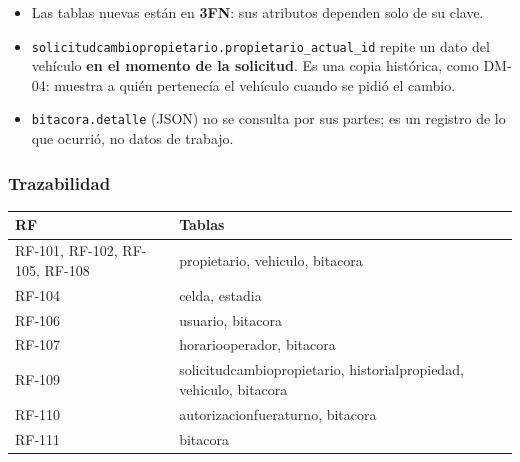 \begin{itemize}
  \item Las tablas nuevas están en \textbf{3FN}: sus atributos dependen solo de su clave.
  \item \texttt{solicitudcambiopropietario.propietario\_actual\_id} repite un dato del vehículo \textbf{en el momento de la solicitud}. Es una copia histórica, como DM-04: muestra a quién pertenecía el vehículo cuando se pidió el cambio.
  \item \texttt{bitacora.detalle} (JSON) no se consulta por sus partes; es un registro de lo que ocurrió, no datos de trabajo.
\end{itemize}

\subsubsection{Trazabilidad}

\begin{longtable}{>{\raggedright\arraybackslash}p{3.7cm}>{\raggedright\arraybackslash}p{10.7cm}}
\toprule
\textbf{RF} & \textbf{Tablas}\\
\midrule\endhead
RF-101, RF-102, RF-105, RF-108 & propietario, vehiculo, bitacora\\
RF-104 & celda, estadia\\
RF-106 & usuario, bitacora\\
RF-107 & horariooperador, bitacora\\
RF-109 & solicitudcambiopropietario, historialpropiedad, vehiculo, bitacora\\
RF-110 & autorizacionfueraturno, bitacora\\
RF-111 & bitacora\\
\bottomrule
\end{longtable}



